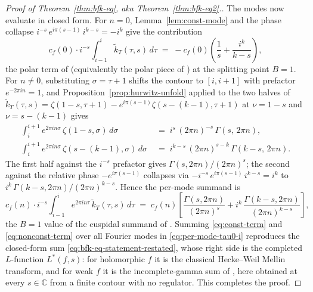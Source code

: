 \documentclass[11pt]{article}
\numberwithin{equation}{section}  %
\newcommand{\CC}{\mathbb{C}}
\begin{document}
\begin{proof}[Proof of Theorem~\ref{thm:bfk-eq}, aka Theorem~\ref{thm:bfk-eq2}.]
The modes now evaluate in closed form.  For $n = 0$, Lemma~\ref{lem:const-mode} and the phase collapse
$i^{-s}\,e^{i\pi(s-1)}\,i^{k-s} = -i^k$ give the contribution
\begin{equation}\label{eq:const-term}
  c_f(0)\cdot i^{-s}\!\int_{i - 1}^{i}\!\widetilde{k}_T(\tau, s)\,d\tau
  \;=\; -c_f(0)\!\left(\frac{1}{s} + \frac{i^k}{k - s}\right),
\end{equation}
the polar term of \cite[Lemma~2.1]{1806} (equivalently the polar piece
of \cite[Thm.~1.1]{BFK2011}) at the splitting point $B = 1$.  For
$n \ne 0$, substituting $\sigma = \tau + 1$ shifts the contour to
$[i, i + 1]$ with prefactor $e^{-2\pi i n} = 1$, and
Proposition~\ref{prop:hurwitz-unfold} applied to the two halves of
$\widetilde{k}_T(\tau, s) = \zeta(1 - s, \tau + 1) - e^{i\pi(s-1)}\zeta(s - (k-1), \tau + 1)$
at $\nu = 1 - s$ and $\nu = s - (k - 1)$ gives
\begin{align}
  \int_i^{i+1}\! e^{2\pi i n \sigma}\,\zeta(1 - s, \sigma)\,d\sigma
  \;&=\; i^s\,(2\pi n)^{-s}\,\Gamma(s,\, 2\pi n),
  \label{eq:unfold-half1}\\
  \int_i^{i+1}\! e^{2\pi i n \sigma}\,\zeta(s - (k - 1), \sigma)\,d\sigma
  \;&=\; i^{k - s}\,(2\pi n)^{s - k}\,\Gamma(k - s,\, 2\pi n).
  \label{eq:unfold-half2}
\end{align}
The first half against the $i^{-s}$ prefactor gives
$\Gamma(s, 2\pi n)/(2\pi n)^s$; the second against the relative phase
$-e^{i\pi(s-1)}$ collapses via $-i^{-s}\,e^{i\pi(s-1)}\,i^{k-s} = i^k$
to $i^k\,\Gamma(k - s, 2\pi n)/(2\pi n)^{k - s}$.  Hence the per-mode
summand is
\begin{equation}\label{eq:nonconst-term}
  c_f(n)\cdot i^{-s}\!\int_{i - 1}^{i}\! e^{2\pi i n \tau}\,
  \widetilde{k}_T(\tau, s)\,d\tau
  \;=\; c_f(n)\!\left[\frac{\Gamma(s, 2\pi n)}{(2\pi n)^s}
  + i^k\,\frac{\Gamma(k - s, 2\pi n)}{(2\pi n)^{k - s}}\right],
\end{equation}
the $B = 1$ value of the cuspidal summand of \cite[Lemma~2.1]{1806}.
Summing \eqref{eq:const-term} and \eqref{eq:nonconst-term} over all
Fourier modes in \eqref{eq:per-mode-tau0-i} reproduces the closed-form
sum \eqref{eq:bfk-eq-statement-restated}, whose right side is the completed
$L$-function $L^*(f, s)$: for holomorphic $f$ it is the classical
Hecke--Weil Mellin transform, and for weak $f$ it is the
incomplete-gamma sum of \cite{BFK2011}, here obtained at every
$s \in \CC$ from a finite contour with no regulator.  This completes
the proof.
\end{proof}
\end{document}
